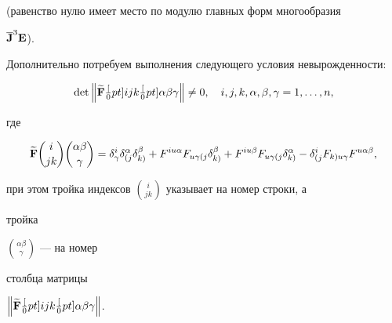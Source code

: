 \begin{notes}
(равенство нулю имеет место по модулю главных форм многообразия 


$\overline{\bold J}^3\bold E$). 


Дополнительно потребуем выполнения следующего условия невырожденности: 


\begin{equation} 


\det\left\|\widetilde{\bold F} 


\textstyle\frac[0pt]{i}{jk}\textstyle\frac[0pt]{\alpha\beta}{\gamma}


\right\|\ne 0,\quad i,j,k,\alpha,\beta,\gamma=1,\dotsc,n, 


\end{equation} 


где 


$$ 


\widetilde{\bold F}\binom{i}{jk}\binom{\alpha\beta}{\gamma}= 


\delta^i_\gamma\delta^\alpha_{(j}\delta^\beta_{k)}+ 


F^{iu\alpha}F_{u\gamma(j}\delta^\beta_{k)}+ 


F^{iu\beta}F_{u\gamma(j}\delta^\alpha_{k)}- 


\delta^i_{(j}F_{k)u\gamma}F^{u\alpha\beta}, 


$$ 


при этом тройка индексов $\binom{i}{jk}$ указывает на номер строки, а 


тройка 


$\binom{\alpha\beta}{\gamma}$ --- на номер 


столбца матрицы 


$\left\|\widetilde{\bold F}


\textstyle\frac[0pt]{i}{jk}


\textstyle\frac[0pt]{\alpha\beta}{\gamma}\right\|$. 


\end{notes} 


 



